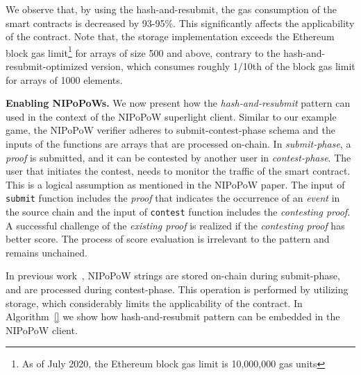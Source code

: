 We observe that, by using the hash-and-resubmit, the gas consumption of the
smart contracts is decreased by 93-95\%. This significantly affects the
applicability of the contract. Note that, the storage implementation exceeds the
Ethereum block gas limit\footnote{As of July 2020, the Ethereum block gas limit
is 10,000,000 gas units} for arrays of size 500 and above, contrary to the
hash-and-resubmit-optimized version, which consumes roughly 1/10th of the block
gas limit for arrays of 1000 elements.

\noindent \textbf{Enabling NIPoPoWs.} We now present how the
\emph{hash-and-resubmit} pattern can used in the context of the NIPoPoW
superlight client. Similar to our example game, the NIPoPoW verifier adheres to
submit-contest-phase schema and the inputs of the functions are arrays that are
processed on-chain. In \emph{submit-phase}, a \emph{proof} is submitted, and it
can be contested by another user in \emph{contest-phase}. The user that
initiates the contest, needs to monitor the traffic of the smart contract. This
is a logical assumption as mentioned in the NIPoPoW paper. The input of
\texttt{submit} function includes the \emph{proof} that indicates the
occurrence of an \emph{event} in the source chain and the input of
\texttt{contest} function includes the \emph{contesting proof}. A successful
challenge of the \emph{existing proof} is realized if the \emph{contesting
proof} has better score. The process of score evaluation is irrelevant to the
pattern and remains unchained.

In previous work~\cite{gglou}, NIPoPoW strings are stored on-chain during
submit-phase, and are processed during contest-phase. This operation is
performed by utilizing storage, which considerably limits the applicability of
the contract. In Algorithm~\ref{} we show how hash-and-resubmit pattern can be
embedded in the NIPoPoW client.



